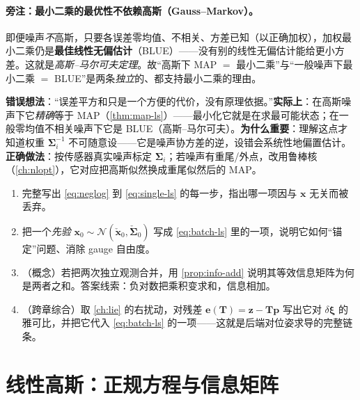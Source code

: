 \paragraph{旁注：最小二乘的最优性不依赖高斯（Gauss–Markov）。}
即便噪声\emph{不}高斯，只要各误差零均值、不相关、方差已知（以正确加权），加权最小二乘仍是\textbf{最佳线性无偏估计}（BLUE）——没有别的线性无偏估计能给更小方差。这就是\emph{高斯–马尔可夫定理}\cite{barfoot2024state}。故“高斯下 MAP $=$ 最小二乘”与“一般噪声下最小二乘 $=$ BLUE”是两条\emph{独立}的、都支持最小二乘的理由。

\begin{pitfall}
\textbf{错误想法}：“误差平方和只是一个方便的代价，没有原理依据。”\textbf{实际上}：在高斯噪声下它\emph{精确}等于 MAP（\cref{thm:map-ls}）——最小化它就是在求最可能状态；在一般零均值不相关噪声下它是 BLUE（高斯–马尔可夫）。\textbf{为什么重要}：理解这点才知道权重 $\boldsymbol{\Sigma}_i^{-1}$ 不可随意设——它是噪声协方差的逆，设错会系统性地偏置估计。\textbf{正确做法}：按传感器真实噪声标定 $\boldsymbol{\Sigma}_i$；若噪声有重尾/外点，改用鲁棒核（\cref{ch:nlopt}），它对应把高斯似然换成重尾似然后的 MAP。
\end{pitfall}

\begin{practice}
\begin{enumerate}
  \item 完整写出 \cref{eq:neglog} 到 \cref{eq:single-ls} 的每一步，指出哪一项因与 $\mathbf{x}$ 无关而被丢弃。
  \item 把一个\emph{先验} $\mathbf{x}_0\sim\mathcal{N}(\check{\mathbf{x}}_0,\check{\boldsymbol{\Sigma}}_0)$ 写成 \cref{eq:batch-ls} 里的一项，说明它如何“锚定”问题、消除 gauge 自由度。
  \item （概念）若把两次独立观测合并，用 \cref{prop:info-add} 说明其等效信息矩阵为何是两者之和。答案线索：负对数把乘积变求和，信息相加。
  \item （跨章综合）取 \cref{ch:lie} 的右扰动，对残差 $\mathbf{e}(\mathbf{T})=\mathbf{z}-\mathbf{T}\mathbf{p}$ 写出它对 $\delta\boldsymbol{\xi}$ 的雅可比，并把它代入 \cref{eq:batch-ls} 的一项——这就是后端对位姿求导的完整链条。
\end{enumerate}
\end{practice}

\section{线性高斯：正规方程与信息矩阵}
\label{sec:est-linear}

